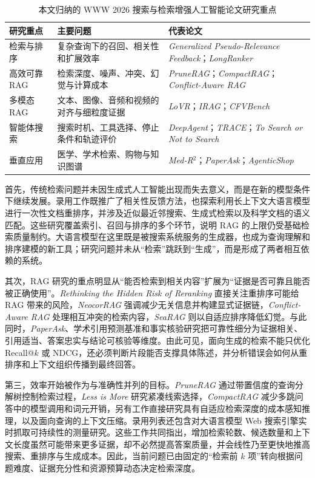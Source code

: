 \begin{table}[htbp]
  \centering
  \caption{本文归纳的 WWW 2026 搜索与检索增强人工智能论文研究重点}
  \label{tab:research-directions}
  \begin{tabularx}{\textwidth}{
    >{\raggedright\arraybackslash}p{}
    >{\raggedright\arraybackslash}X
    >{\raggedright\arraybackslash}X}
    \toprule
    研究重点 & 主要问题 & 代表论文 \\
    \midrule
    检索与排序 & 复杂查询下的召回、相关性和扩展效率 & \emph{Generalized Pseudo-Relevance Feedback}；\mbox{\emph{LongRanker}} \\
    高效可靠 RAG & 检索深度、噪声、冲突、幻觉与计算成本 & \emph{PruneRAG}；\emph{CompactRAG}；\emph{Conflict-Aware RAG} \\
    多模态 RAG & 文本、图像、音频和视频的对齐与细粒度证据 & \emph{LoVR}；\emph{IRAG}；\emph{CFVBench} \\
    智能体搜索 & 搜索时机、工具选择、停止条件和轨迹评价 & \emph{DeepAgent}；\emph{TRACE}；\emph{To Search or Not to Search} \\
    垂直应用 & 医学、学术检索、购物与知识图谱 & \emph{Med-R$^2$}；\emph{PaperAsk}；\emph{AgenticShop} \\
    \bottomrule
  \end{tabularx}
\end{table}

首先，传统检索问题并未因生成式人工智能出现而失去意义，而是在新的模型条件下继续发展。录用工作既推广了相关性反馈方法，也探索利用长上下文大语言模型进行一次性文档重排序，并涉及近似最近邻搜索、生成式检索以及科学文档的语义匹配。这些研究覆盖索引、召回与排序的多个环节，说明 RAG 的上限仍受基础检索质量制约。大语言模型在这里既是被搜索系统服务的生成器，也成为查询理解和排序建模的新工具；研究问题并未从“检索”跳跃到“生成”，而是形成了两者相互依赖的系统。

其次，RAG 研究的重点明显从“能否检索到相关内容”扩展为“证据是否可靠且能否被正确使用”。\emph{Rethinking the Hidden Risk of Reranking} 直接关注重排序可能给 RAG 带来的风险，\emph{NeocorRAG} 强调减少无关信息并构建显式证据链，\emph{Conflict-Aware RAG} 处理相互冲突的检索内容，\emph{SeaRAG} 则以自适应排序降低幻觉。与此同时，\emph{PaperAsk}、学术引用预测基准和事实核验研究把可靠性细分为证据相关、引用适当、答案忠实与结论可核验等维度。由此可见，面向生成的检索不能只优化 Recall@$k$ 或 NDCG，还必须判断片段能否支撑具体陈述，并分析错误会如何从重排序和上下文组织传播到最终回答。

第三，效率开始被作为与准确性并列的目标。\emph{PruneRAG} 通过带置信度的查询分解树控制检索过程，\emph{Less is More} 研究紧凑线索选择，\emph{CompactRAG} 减少多跳问答中的模型调用和词元开销，另有工作直接研究具有自适应检索深度的成本感知推理，以及面向查询的上下文压缩。录用列表还包含对大语言模型 Web 搜索引擎实时抓取可持续性的测量研究。这些工作共同指出，增加检索轮数、候选数量和上下文长度虽然可能带来更多证据，却不必然提高答案质量，并会线性乃至更快地推高搜索、重排序与生成成本。因此，当前问题已由固定的“检索前 $k$ 项”转向根据问题难度、证据充分性和资源预算动态决定检索深度。

